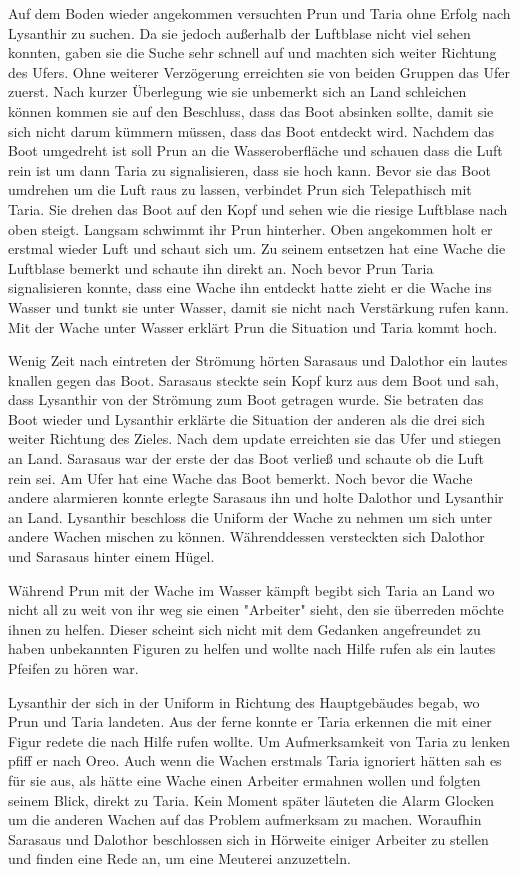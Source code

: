 \documentclass[10pt,twoside,twocolumn,openany]{book}
\begin{document}
	Auf dem Boden wieder angekommen versuchten Prun und Taria ohne Erfolg nach Lysanthir zu suchen. Da sie jedoch außerhalb der Luftblase nicht viel sehen konnten, gaben sie die Suche sehr schnell auf und machten sich weiter Richtung des Ufers. Ohne weiterer Verzögerung erreichten sie von beiden Gruppen das Ufer zuerst. Nach kurzer Überlegung wie sie unbemerkt sich an Land schleichen können kommen sie auf den Beschluss, dass das Boot absinken sollte, damit sie sich nicht darum kümmern müssen, dass das Boot entdeckt wird. Nachdem das Boot umgedreht ist soll Prun an die Wasseroberfläche und schauen dass die Luft rein ist um dann Taria zu signalisieren, dass sie hoch kann. Bevor sie das Boot umdrehen um die Luft raus zu lassen, verbindet Prun sich Telepathisch mit Taria. Sie drehen das Boot auf den Kopf und sehen wie die riesige Luftblase nach oben steigt. Langsam schwimmt ihr Prun hinterher. Oben angekommen holt er erstmal wieder Luft und schaut sich um. Zu seinem entsetzen hat eine Wache die Luftblase bemerkt und schaute ihn direkt an. Noch bevor Prun Taria signalisieren konnte, dass eine Wache ihn entdeckt hatte zieht er die Wache ins Wasser und tunkt sie unter Wasser, damit sie nicht nach Verstärkung rufen kann. Mit der Wache unter Wasser erklärt Prun die Situation und Taria kommt hoch. 
	
	Wenig Zeit nach eintreten der Strömung hörten Sarasaus und Dalothor ein lautes knallen gegen das Boot. Sarasaus steckte sein Kopf kurz aus dem Boot und sah, dass Lysanthir von der Strömung zum Boot getragen wurde. Sie betraten das Boot wieder und Lysanthir erklärte die Situation der anderen als die drei sich weiter Richtung des Zieles. Nach dem update erreichten sie das Ufer und stiegen an Land. Sarasaus war der erste der das Boot verließ und schaute ob die Luft rein sei. Am Ufer hat eine Wache das Boot bemerkt. Noch bevor die Wache andere alarmieren konnte erlegte Sarasaus ihn und holte Dalothor und Lysanthir an Land. Lysanthir beschloss die Uniform der Wache zu nehmen um sich unter andere Wachen mischen zu können. Währenddessen versteckten sich Dalothor und Sarasaus hinter einem Hügel.
	
	Während Prun mit der Wache im Wasser kämpft begibt sich Taria an Land wo nicht all zu weit von ihr weg sie einen "Arbeiter" sieht, den sie überreden möchte ihnen zu helfen. Dieser scheint sich nicht mit dem Gedanken angefreundet zu haben unbekannten Figuren zu helfen und wollte nach Hilfe rufen als ein lautes Pfeifen zu hören war. 
	
	Lysanthir der sich in der Uniform in Richtung des Hauptgebäudes begab, wo Prun und Taria landeten. Aus der ferne konnte er Taria erkennen die mit einer Figur redete die nach Hilfe rufen wollte. Um Aufmerksamkeit von Taria zu lenken pfiff er nach Oreo. Auch wenn die Wachen erstmals Taria ignoriert hätten sah es für sie aus, als hätte eine Wache einen Arbeiter ermahnen wollen und folgten seinem Blick, direkt zu Taria. Kein Moment später läuteten die Alarm Glocken um die anderen Wachen auf das Problem aufmerksam zu machen. Woraufhin Sarasaus und Dalothor beschlossen sich in Hörweite einiger Arbeiter zu stellen und finden eine Rede an, um eine Meuterei anzuzetteln.
	
\end{document}
